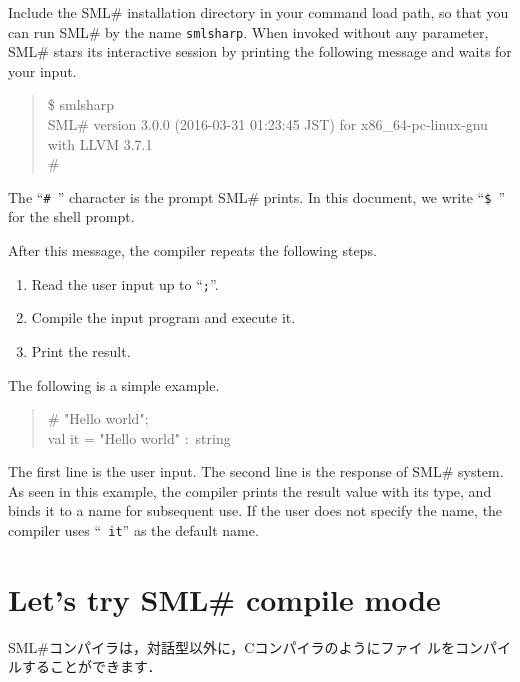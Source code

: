 \documentclass{jbook}
\newif\ifjp
\newcommand{\txt}[2]{#2}
\newcommand{\smlsharp}{SML\#}
\newcommand{\version}{3.0.0}
\newcommand{\releaseDate}{2016-03-31 01:23:45 JST}
\newenvironment{program}{\begin{quote}\begin{tt}}%
                        {\end{tt}\end{quote}}
\begin{document}
	Include the \smlsharp{} installation directory in your command
load path,  so that you can run \smlsharp{} by the name {\tt smlsharp}.
	When invoked without any parameter, \smlsharp{} stars its
interactive session by printing the following message and waits for your
input.
\begin{program}
\$ smlsharp\\
SML\# version \version{} (\releaseDate{}) for x86\_64-pc-linux-gnu with LLVM 3.7.1\\
\# 
\end{program}
	The ``{\tt \#\ }'' character is the prompt \smlsharp{}
prints.
	In this document, we write ``{\tt \$\ }'' for the 
shell prompt.

	After this message, the compiler repeats the following steps. 
\begin{enumerate}
\item Read the user input up to ``{\tt ;}''.
\item Compile the input program and execute it.
\item Print the result.
\end{enumerate}
	The following is a simple example.
\begin{tt}
\begin{quote}
\# "Hello world";\\
val it = "Hello world" :~string
\end{quote}
\end{tt}
	The first line is the user input.
	The second line is the response of \smlsharp{} system.
	As seen in this example, the compiler prints the result value with
its type, and binds it to a name for subsequent use.
	If the user does not specify the name, the compiler uses  ``{\tt
it}'' as the default name.

\fi%

\section{
\txt
{\smlsharp{}のコンパイルモードを試してみよう}
{Let's try \smlsharp{} compile mode}
}
\label{sec:tutorialCompile}

\ifjp%
	\smlsharp{}コンパイラは，対話型以外に，Cコンパイラのようにファイ
ルをコンパイルすることができます．
\end{document}
